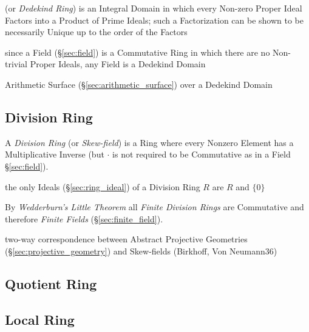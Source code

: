 (or \emph{Dedekind Ring}) is an Integral Domain in which every Non-zero Proper
Ideal Factors into a Product of Prime Ideals; such a Factorization can be shown
to be necessarily Unique up to the order of the Factors

since a Field (\S\ref{sec:field}) is a Commutative Ring in which there are no
Non-trivial Proper Ideals, any Field is a Dedekind Domain

\fist Arithmetic Surface (\S\ref{sec:arithmetic_surface}) over a Dedekind Domain



\subsection{Division Ring}\label{sec:division_ring}

A \emph{Division Ring} (or \emph{Skew-field}) is a Ring where every Nonzero
Element has a Multiplicative Inverse (but $\cdot$ is not required to be
Commutative as in a Field \S\ref{sec:field}).

the only Ideals (\S\ref{sec:ring_ideal}) of a Division Ring $R$ are $R$ and
$\{0\}$

By \emph{Wedderburn's Little Theorem} all \emph{Finite Division Rings}
are Commutative and therefore \emph{Finite Fields}
(\S\ref{sec:finite_field}).

two-way correspondence between Abstract Projective Geometries
(\S\ref{sec:projective_geometry}) and Skew-fields (Birkhoff, Von Neumann36)



\subsection{Quotient Ring}\label{sec:quotient_ring}

\subsection{Local Ring}\label{sec:local_ring}

